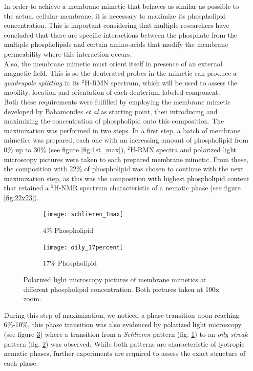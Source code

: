 \documentclass[twoside,twocolumn,9pt]{article}
\begin{document}
In order to achieve a membrane mimetic that behaves as similar as possible to
the actual cellular membrane, it is necessary to maximize its phospholipid
concentration. This is important considering that multiple researchers have
concluded that there are specific interactions between the phosphate from the
multiple phospholipids and certain amino-acids that modify the membrane
permeability where this interaction occurs\cite{Aliaga2011,Hristova2011}.\\
Also, the membrane mimetic must orient itself in presence of an external
magnetic field. This is so the deuterated probes in the mimetic can produce a
\textit{quadrupole splitting} in its $^2$H-RMN spectrum, which will be used to
assess the mobility, location and orientation of each deuterium labeled component.\\
Both these requirements were fulfilled by employing the membrane mimetic
developed by Bahamondes \textit{et al}\cite{Bahamonde-Padilla2013} as starting
point, then introducing and maximizing the concentration of phospholipid onto
this composition. The maximization was performed in two steps. In a first step,
a batch of membrane mimetics was prepared, each one with an increasing amount of
phospholipid from 0\% up to 30\% (see figure \ref{fig:1st_max}), $^2$H-RMN
spectra and polarized light microscopy pictures were taken to each prepared
membrane mimetic. From these, the composition with 22\% of phospholipid was
chosen to continue with the next maximization step, as this was the composition
with highest phospholipid content that retained a $^2$H-NMR spectrum
characteristic of a nematic phase (see figure \ref{fig:22v23}).\\

\begin{figure}[h]
  \centering
  \begin{subfigure}{0.45\columnwidth}
    \texttt{[image: schlieren\_1max]}
    \caption{4\% Phospholipid}
    \label{fig:schlieren}
  \end{subfigure}
  \begin{subfigure}{0.45\columnwidth}
    \texttt{[image: oily\_17percent]}
    \caption{17\% Phospholipid}
    \label{fig:oily}
  \end{subfigure}
  \caption{Polarized light microscopy pictures of membrane mimetics at different
  phospholipid concentration. Both pictures taken at 100x zoom.}
  \label{fig:plm}
\end{figure}

During this step of maximization, we noticed a phase transition upon reaching
6\%-10\%, this phase transition was also evidenced by polarized light microscopy
(see figure \ref{fig:plm}) where a transition from a \textit{Schlieren} pattern
(fig. \ref{fig:schlieren}) to an \textit{oily streak} pattern (fig.
\ref{fig:oily}) was observed. While both patterns are characteristic of
lyotropic nematic phases, further experiments are required to assess the exact
structure of each phase.
\end{document}
